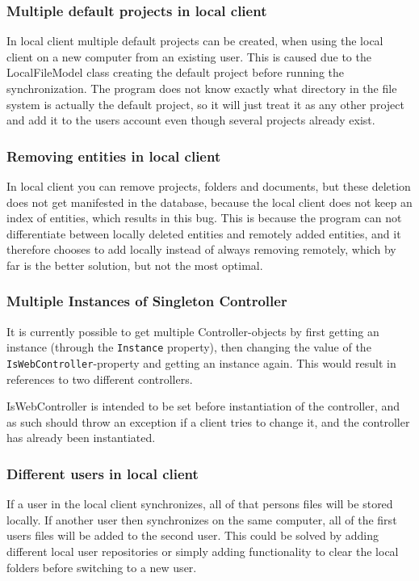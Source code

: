 \subsubsection{Multiple default projects in local client}
In local client multiple default projects can be created, when using the local client on a new computer from an existing user. This is caused due to the LocalFileModel class creating the default project before running the synchronization. The program does not know exactly what directory in the file system is actually the default project, so it will just treat it as any other project and add it to the users account even though several projects already exist.

\subsubsection{Removing entities in local client}
In local client you can remove projects, folders and documents, but these deletion does not get manifested in the database, because the local client does not keep an index of entities, which results in this bug. This is because the program can not differentiate between locally deleted entities and remotely added entities, and it therefore chooses to add locally instead of always removing remotely, which by far is the better solution, but not the most optimal.

\subsubsection{Multiple Instances of Singleton Controller}
It is currently possible to get multiple Controller-objects by first getting an instance (through the \verb|Instance| property),
then changing the value of the \verb|IsWebController|-property and getting an instance again. This would result in references to
two different controllers.

IsWebController is intended to be set before instantiation of the controller, and as such should throw an exception if a client tries
to change it, and the controller has already been instantiated.

\subsubsection{Different users in local client}
If a user in the local client synchronizes, all of that persons files will be stored locally. If another user then synchronizes on the same computer, all of the first users files will be added to the second user. This could be solved by adding different local user repositories or simply adding functionality to clear the local folders before switching to a new user.